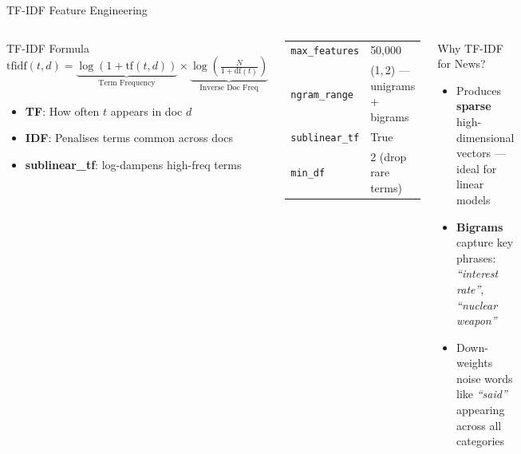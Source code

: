 \documentclass[aspectratio=169,11pt]{beamer}
\begin{document}
\begin{frame}{TF-IDF Feature Engineering}
\begin{columns}[T]
    \begin{block}{TF-IDF Formula}
      \small
      \[
        \text{tfidf}(t,d) = \underbrace{\log(1+\text{tf}(t,d))}_{\text{Term Frequency}} \times \underbrace{\log\!\left(\tfrac{N}{1+\text{df}(t)}\right)}_{\text{Inverse Doc Freq}}
      \]
      \begin{itemize}\footnotesize
        \item \textbf{TF}: How often $t$ appears in doc $d$
        \item \textbf{IDF}: Penalises terms common across docs
        \item \textbf{sublinear\_tf}: log-dampens high-freq terms
      \end{itemize}
    \end{block}
    \vspace{4pt}
    \begin{tcolorbox}[colback=accent!8,colframe=accent,title=Vectoriser Settings,fonttitle=\footnotesize\bfseries]
      \footnotesize
      \begin{tabular}{ll}
        \texttt{max\_features} & 50,000 \\
        \texttt{ngram\_range}  & (1,\,2) --- unigrams + bigrams \\
        \texttt{sublinear\_tf} & True \\
        \texttt{min\_df}       & 2 (drop rare terms) \\
      \end{tabular}
    \end{tcolorbox}
    \begin{block}{Why TF-IDF for News?}
      \footnotesize
      \begin{itemize}
        \item Produces \textbf{sparse} high-dimensional vectors --- ideal for linear models
        \item \textbf{Bigrams} capture key phrases: \textit{``interest rate''}, \textit{``nuclear weapon''}
        \item Down-weights noise words like \textit{``said''} appearing across all categories
      \end{itemize}
    \end{block}
    \vspace{4pt}
    \begin{tcolorbox}[colback=light,colframe=primary,title=Matrix Properties,fonttitle=\footnotesize\bfseries]

\end{tcolorbox}
\end{columns}
\end{frame}
\end{document}
